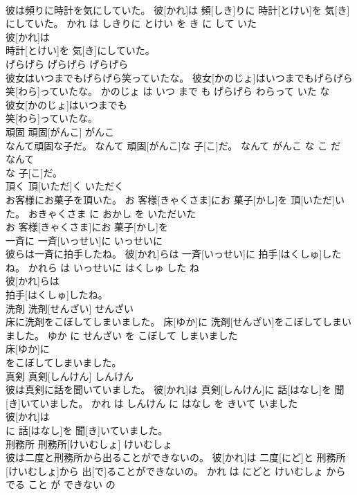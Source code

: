 \documentclass[8pt]{extreport}
\begin{document}
\begin{CJK}{UTF8}{min}
\\	彼は頻りに時計を気にしていた。	彼[かれ]は 頻[しき]りに 時計[とけい]を 気[き]にしていた。	かれ は しきりに とけい を き に して いた	
\\	彼[かれ]は
\\	時計[とけい]を 気[き]にしていた。			
\\	げらげら	げらげら	げらげら	
\\	彼女はいつまでもげらげら笑っていたな。	彼女[かのじょ]はいつまでもげらげら 笑[わら]っていたな。	かのじょ は いつ まで も げらげら わらって いた な	
\\	彼女[かのじょ]はいつまでも
\\	笑[わら]っていたな。			
\\	頑固	頑固[がんこ]	がんこ	
\\	なんて頑固な子だ。	なんて 頑固[がんこ]な 子[こ]だ。	なんて がんこ な こ だ	
\\	なんて
\\	な 子[こ]だ。			
\\	頂く	頂[いただ]く	いただく	
\\	お客様にお菓子を頂いた。	お 客様[きゃくさま]にお 菓子[かし]を 頂[いただ]いた。	おきゃくさま に おかし を いただいた	
\\	お 客様[きゃくさま]にお 菓子[かし]を
\\	一斉に	一斉[いっせい]に	いっせいに	
\\	彼らは一斉に拍手したね。	彼[かれ]らは 一斉[いっせい]に 拍手[はくしゅ]したね。	かれら は いっせいに はくしゅ した ね	
\\	彼[かれ]らは
\\	拍手[はくしゅ]したね。			
\\	洗剤	洗剤[せんざい]	せんざい	
\\	床に洗剤をこぼしてしまいました。	床[ゆか]に 洗剤[せんざい]をこぼしてしまいました。	ゆか に せんざい を こぼして しまいました	
\\	床[ゆか]に
\\	をこぼしてしまいました。			
\\	真剣	真剣[しんけん]	しんけん	
\\	彼は真剣に話を聞いていました。	彼[かれ]は 真剣[しんけん]に 話[はなし]を 聞[き]いていました。	かれ は しんけん に はなし を きいて いました	
\\	彼[かれ]は
\\	に 話[はなし]を 聞[き]いていました。			
\\	刑務所	刑務所[けいむしょ]	けいむしょ	
\\	彼は二度と刑務所から出ることができないの。	彼[かれ]は 二度[にど]と 刑務所[けいむしょ]から 出[で]ることができないの。	かれ は にどと けいむしょ から でる こと が できない の	

\end{CJK}
\end{document}
